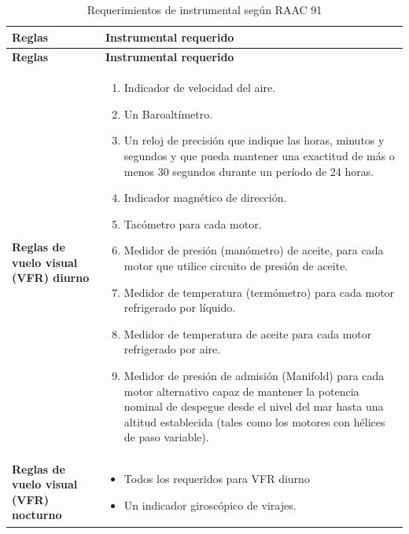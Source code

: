   \begin{longtable}{m{}m{}}
    \caption{Requerimientos de instrumental seg\'un RAAC 91}
    \label{tab:01.requerimientos.instrumentos.RAAC.91} \\  \hline \rowcolor{bubbles}

      {\bf Reglas} & {\bf Instrumental requerido} \\ \hline \endfirsthead  \hline \rowcolor{bubbles}
      {\bf Reglas} & {\bf Instrumental requerido} \\ \hline \endhead

	\hline \endfoot  \hline \endlastfoot


      {\bf Reglas de vuelo visual (VFR) diurno}
      &
      {\scriptsize
        \begin{enumerate}
        \item Indicador de velocidad del aire.
        \item Un Baroaltímetro.
        \item Un reloj de precisión que indique las horas, minutos y
          segundos y que pueda mantener una exactitud de más o menos
          30 segundos durante un período de 24 horas.
        \item Indicador magnético de dirección.
        \item Tacómetro para cada motor.
        \item Medidor de presión (manómetro) de aceite, para cada
          motor que utilice circuito de presión de aceite.
        \item Medidor de temperatura (termómetro) para cada motor
          refrigerado por líquido.
        \item Medidor de temperatura de aceite para cada motor
          refrigerado por aire.
        \item Medidor de presión de admisión (Manifold) para cada
          motor alternativo capaz de mantener la potencia nominal de
          despegue desde el nivel del mar hasta una altitud
          establecida (tales como los motores con hélices de paso
          variable).
        \end{enumerate}
      } \\ \rowcolor{cyan!20}
\textbf{Reglas  de  vuelo  visual  (VFR)  nocturno}
& {\scriptsize
\begin{itemize}
	\item Todos los requeridos para VFR diurno
        \item Un indicador giroscópico de virajes.
\end{itemize}
}
\end{longtable}
